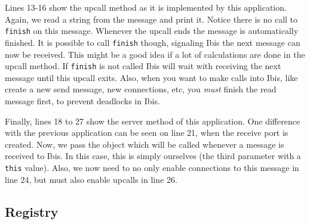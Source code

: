 Lines 13-16 show the upcall method as it is implemented by this
application. Again, we read a string from the message and print it.
Notice there is no call to \texttt{finish} on this message. Whenever the
upcall ends the message is automatically finished. It is possible to
call \texttt{finish} though, signaling Ibis the next message can now be
received. This might be a good idea if a lot of calculations are done in
the upcall method. If \texttt{finish} is not called Ibis will wait with
receiving the next message until this upcall exits. Also, when you want
to make calls into Ibis, like create a new send message, new
connections, etc, you \emph{must} finish the read message first, to
prevent deadlocks in Ibis.

Finally, lines 18 to 27 show the server method of this application. One
difference with the previous application can be seen on line 21, when
the receive port is created. Now, we pass the object which will be
called whenever a message is received  to Ibis. In this case, this is
simply ourselves (the third parameter with a \texttt{this} value). Also,
we now need to no only enable connections to this message in line 24,
but must also enable upcalls in line 26.

\subsection{Registry}

